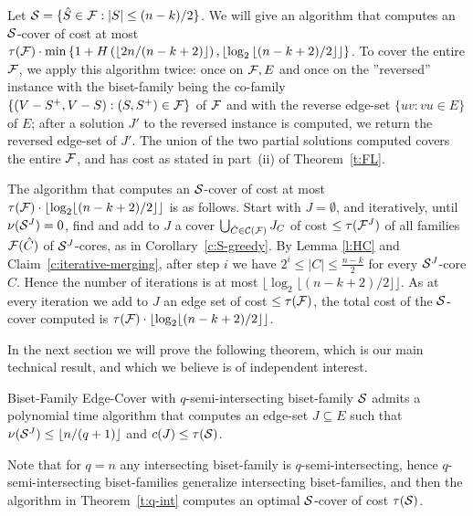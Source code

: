 Let ${\cal S}=\{\hat{S} \in {\cal F}: |S| \leq (n-k)/2\}$.
We will give an algorithm that computes an ${\cal S}$-cover of cost at most
$\tau({\cal F}) \cdot \min\left\{1+H\left(\left\lfloor 2n/(n-k+2) \right\rfloor \right),
\left\lfloor \log_2 \left\lfloor (n-k+2)/2 \right\rfloor \right\rfloor \right\}$.
To cover the entire ${\cal F}$, we apply this algorithm twice: 
once on ${\cal F},E$ and once on the ''reversed'' instance with the biset-family being the co-family 
$\{(V-S^+,V-S):(S,S^+) \in {\cal F}\}$ of ${\cal F}$ and with the reverse edge-set $\{uv: vu \in E\}$ of $E$;
after a solution $J'$ to the reversed instance is computed, we return the reversed edge-set of $J'$.
The union of the two partial solutions computed covers the entire ${\cal F}$,
and has cost as stated in part~(ii) of Theorem~\ref{t:FL}.

The algorithm that computes an ${\cal S}$-cover of cost at most 
$\tau({\cal F}) \cdot \lfloor \log_2 \lfloor (n-k+2)/2 \rfloor \rfloor$ is as follows.
Start with $J=\emptyset$, and iteratively, until $\nu({\cal S}^J)=0$, find and add to $J$
a cover $\bigcup_{\hat{C} \in {\cal C}({\cal F})} J_C$ of cost $\leq \tau({\cal F}^J)$
of all families ${\cal F}(\hat{C})$ of ${\cal S}^J$-cores, as in Corollary~\ref{c:S-greedy}.
By Lemma \ref{l:HC} and Claim~\ref{c:iterative-merging}, 
after step $i$ we have $2^i \leq |C| \leq \frac{n-k}{2}$ for every ${\cal S}^J$-core $\hat{C}$.
Hence the number of iterations is at most $\lfloor \log_2 \lfloor (n-k+2)/2 \rfloor \rfloor$. 
As at every iteration we add to $J$ an edge set of cost $\leq \tau({\cal F})$, the total
cost of the ${\cal S}$-cover computed is $\tau({\cal F}) \cdot \lfloor \log_2 \lfloor (n-k+2)/2 \rfloor \rfloor$.

In the next section we will prove the following theorem, which is our main technical result,
and which we believe is of independent interest.

\begin{theorem} \label{t:q-int}
{\sf Biset-Family Edge-Cover} with $q$-semi-intersecting biset-family ${\cal S}$ admits a polynomial time algorithm 
that computes an edge-set $J \subseteq E$ such that $\nu({\cal S}^J) \leq \left\lfloor n/(q+1) \right\rfloor$ 
and $c(J) \leq \tau({\cal S})$. 
\end{theorem}

Note that for $q=n$ any intersecting biset-family is $q$-semi-intersecting, hence 
$q$-semi-intersecting biset-families generalize intersecting biset-families, 
and then the algorithm in Theorem~\ref{t:q-int} computes an optimal ${\cal S}$-cover of cost $\tau({\cal S})$.

